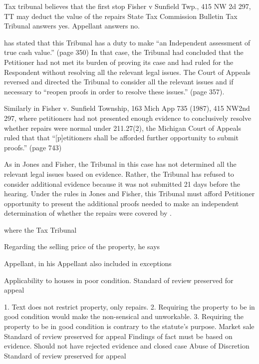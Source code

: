 \documentclass[12pt,\documentclassflag]{michiganCourtOfAppealsBrief}
\begin{document}
 
Tax tribunal believes that the first stop
Fisher v Sunfield Twp., 415 NW 2d 297, TT may deduct the value of the repairs
State Tax Commission Bulletin
	Tax Tribunal answers yes. Appellant answers no.
 
 
 
has stated that this Tribunal has a duty to make ``an Independent assessment of true cash value.'' (page 350) In that case, the Tribunal had concluded that the Petitioner had not met its burden of proving its case and had ruled for the Respondent without resolving all the relevant legal issues. The Court of Appeals reversed and directed the Tribunal to consider all the relevant issues and if necessary to ``reopen proofs in order to resolve these issues.'' (page 357). 

Similarly in Fisher v. Sunfield Township, 163 Mich App 735 (1987), 415 NW2nd 297, where petitioners had not presented enough evidence to conclusively resolve whether repairs were normal under 211.27(2), the Michigan Court of Appeals ruled that that ``[p]etitioners shall be afforded further opportunity to submit proofs.'' (page 743) 

As in Jones and Fisher, the Tribunal in this case has not determined all the relevant legal issues based on evidence. Rather, the Tribunal has refused to consider additional evidence because it was not submitted 21 days before the hearing. Under the rules in Jones and Fisher, this Tribunal must afford Petitioner opportunity to present the additional proofs needed to make an independent determination of whether the repairs were covered by . 

where the Tax Tribunal 
 
Regarding the selling price of the property, he says 
 
 
Appellant, in his 
Appellant also included in exceptions 
 
 
Applicability to houses in poor condition.
Standard of review
preserved for appeal
 
 
 
 
 
 
1. Text does not restrict property, only repairs.
2. Requiring the property to be in good condition would make the non-sensical and unworkable.
3. Requiring the property to be in good condition is contrary to the statute's purpose.
Market sale
Standard of review
preserved for appeal
Findings of fact must be based on evidence.
Should not have rejected evidence and closed case Abuse of Discretion
Standard of review
preserved for appeal
 
\end{document}
